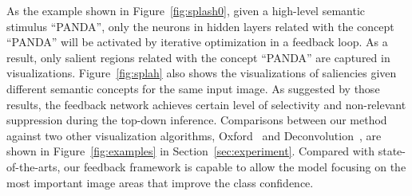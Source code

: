 As the example shown in Figure~\ref{fig:splash0}, given a high-level semantic stimulus ``PANDA'', only the neurons in hidden layers related with the concept ``PANDA'' will be activated by iterative optimization in a feedback loop. As a result, only salient regions related with the concept ``PANDA'' are captured in visualizations. Figure~\ref{fig:splah} also shows the visualizations of saliencies given different semantic concepts for the same input image. As suggested by those results, the feedback network achieves certain level of selectivity and non-relevant suppression during the top-down inference. Comparisons between our method against two other visualization algorithms, Oxford~\cite{simonyan2013deep} and Deconvolution~\cite{zeiler2014visualizing}, are shown in Figure~\ref{fig:examples} in Section~\ref{sec:experiment}. Compared with state-of-the-arts, our feedback framework is capable to allow the model focusing on the most important image areas that improve the class confidence.

